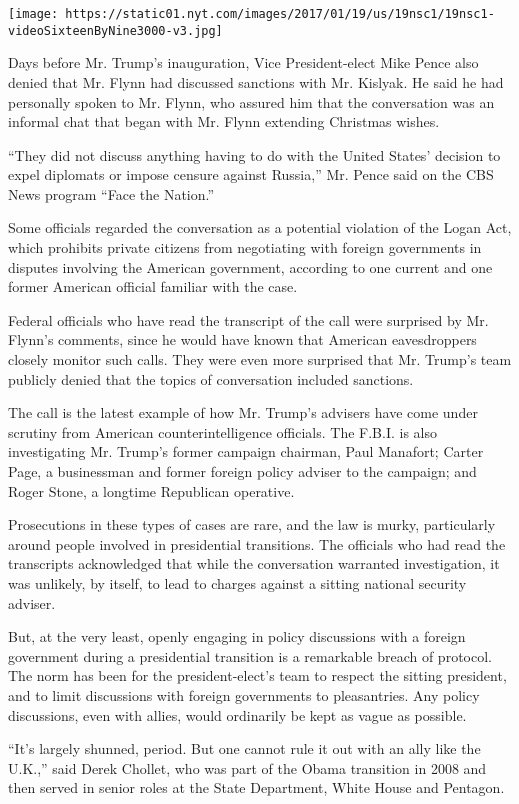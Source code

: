 \texttt{[image: https://static01.nyt.com/images/2017/01/19/us/19nsc1/19nsc1-videoSixteenByNine3000-v3.jpg]}

Days before Mr. Trump's inauguration, Vice President-elect Mike Pence
also denied that Mr. Flynn had discussed sanctions with Mr. Kislyak. He
said he had personally spoken to Mr. Flynn, who assured him that the
conversation was an informal chat that began with Mr. Flynn extending
Christmas wishes.

``They did not discuss anything having to do with the United States'
decision to expel diplomats or impose censure against Russia,'' Mr.
Pence said on the CBS News program ``Face the Nation.''

Some officials regarded the conversation as a potential violation of the
Logan Act, which prohibits private citizens from negotiating with
foreign governments in disputes involving the American government,
according to one current and one former American official familiar with
the case.

Federal officials who have read the transcript of the call were
surprised by Mr. Flynn's comments, since he would have known that
American eavesdroppers closely monitor such calls. They were even more
surprised that Mr. Trump's team publicly denied that the topics of
conversation included sanctions.

The call is the latest example of how Mr. Trump's advisers have come
under scrutiny from American counterintelligence officials. The F.B.I.
is also investigating Mr. Trump's former campaign chairman, Paul
Manafort; Carter Page, a businessman and former foreign policy adviser
to the campaign; and Roger Stone, a longtime Republican operative.

Prosecutions in these types of cases are rare, and the law is murky,
particularly around people involved in presidential transitions. The
officials who had read the transcripts acknowledged that while the
conversation warranted investigation, it was unlikely, by itself, to
lead to charges against a sitting national security adviser.

But, at the very least, openly engaging in policy discussions with a
foreign government during a presidential transition is a remarkable
breach of protocol. The norm has been for the president-elect's team to
respect the sitting president, and to limit discussions with foreign
governments to pleasantries. Any policy discussions, even with allies,
would ordinarily be kept as vague as possible.

``It's largely shunned, period. But one cannot rule it out with an ally
like the U.K.,'' said Derek Chollet, who was part of the Obama
transition in 2008 and then served in senior roles at the State
Department, White House and Pentagon.

